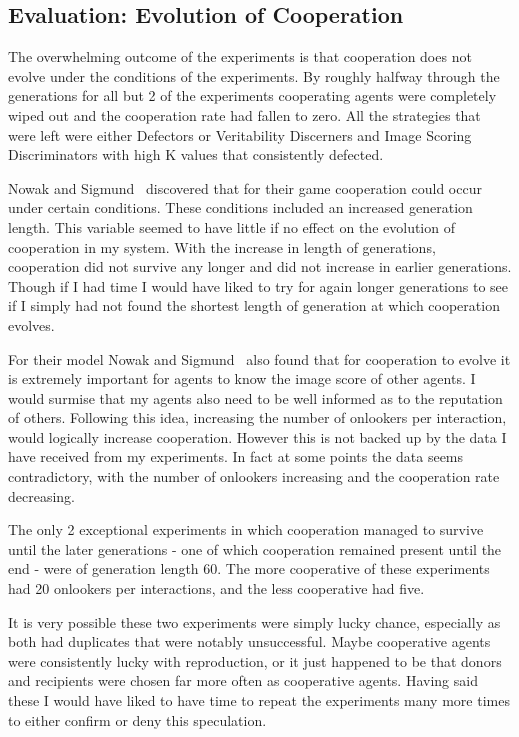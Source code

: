 \documentclass[]{final_report}
\begin{document}
\subsection{Evaluation: Evolution of Cooperation}
The overwhelming outcome of the experiments is that cooperation does not evolve under the conditions of the experiments. By roughly halfway through the generations for all but 2 of the experiments cooperating agents were completely wiped out and the cooperation rate had fallen to zero. All the strategies that were left were either Defectors or Veritability Discerners and Image Scoring Discriminators with high K values that consistently defected.\par 
Nowak and Sigmund~\cite{evol_indirect_image} discovered that for their game cooperation could occur under certain conditions. These conditions included an increased generation length. This variable seemed to have little if no effect on the evolution of cooperation in my system. With the increase in length of generations, cooperation did not survive any longer and did not increase in earlier generations. Though if I had time I would have liked to try for again longer generations to see if I simply had not found the shortest length of generation at which cooperation evolves.\par 
For their model Nowak and Sigmund~\cite{evol_indirect_image} also found that for cooperation to evolve it is extremely important for agents to know the image score of other agents. I would surmise that my agents also need to be well informed as to the reputation of others. Following this idea, increasing the number of onlookers per interaction, would logically increase cooperation. However this is not backed up by the data I have received from my experiments. In fact at some points the data seems contradictory, with the number of onlookers increasing and the cooperation rate decreasing.\par 
The only 2 exceptional experiments in which cooperation managed to survive until the later generations - one of which cooperation remained present until the end - were of generation length 60. The more cooperative of these experiments had 20 onlookers per interactions, and the less cooperative had five.\par 
It is very possible these two experiments were simply lucky chance, especially as both had duplicates that were notably unsuccessful. Maybe cooperative agents were consistently lucky with reproduction, or it just happened to be that donors and recipients were chosen far more often as cooperative agents. Having said these I would have liked to have time to repeat the experiments many more times to either confirm or deny this speculation.
\end{document}
